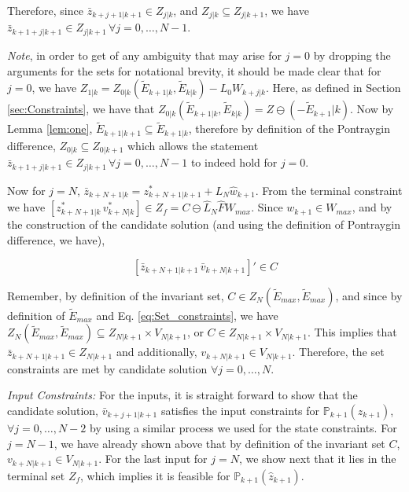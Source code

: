 Therefore, since $\bar{z}_{k+j+1|k+1} \in Z_{j|k}$, and $Z_{j|k} \subseteq Z_{j|k+1}$, we have $\bar{z}_{k+1+j|k+1} \in Z_{j|k+1}\,\forall j=0,\dotsc,N-1$. 

\textit{Note}, in order to get of any ambiguity that may arise for $j=0$ by dropping the arguments for the sets for notational brevity, it should be made clear that for $j=0$, we have $Z_{1|k} = Z_{0|k}(\tilde{E}_{k+1|k},\tilde{E}_{k|k})-L_0W_{k+j|k}$. Here, as defined in Section \ref{sec:Constraints}, we have that $Z_{0|k}(\tilde{E}_{k+1|k},\tilde{E}_{k|k}) = Z \ominus (-\tilde{E}_{k+1}|k)$. Now by Lemma \ref{lem:one}, $\tilde{E}_{k+1|k+1} \subseteq \tilde{E}_{k+1|k}$, therefore by definition of the Pontraygin difference, $Z_{0|k} \subseteq Z_{0|k+1}$ which allows the statement $\bar{z}_{k+1+j|k+1} \in Z_{j|k+1}\,\forall j=0,\dotsc,N-1$ to indeed hold for $j=0$.


Now for $j=N$, $\bar{z}_{k+N+1|k} = z^{*}_{k+N+1|k+1} + L_N\hat{w}_{k+1}$. From the terminal constraint we have $[z^{*}_{k+N+1|k}\, v^{*}_{k+N|k}] \in Z_f = C \ominus \hat{L}_N\hat{F}W_{max}$. Since $w_{k+1} \in W_{max}$, and by the construction of the candidate solution (and using the definition of Pontraygin difference, we have), 

\begin{equation}
\label{eq:CandidateInC}
[\bar{z}_{k+N+1|k+1}\, \bar{v}_{k+N|k+1}]' \in C
\end{equation}

Remember, by definition of the invariant set, $C \in Z_N(\tilde{E}_{max},\tilde{E}_{max})$, and since by definition of $\tilde{E}_{max}$ and Eq. \ref{eq:Set_constraints}, we have $Z_N(\tilde{E}_{max},\tilde{E}_{max}) \subseteq Z_{N|k+1} \times V_{N|k+1}$, or $C \in  Z_{N|k+1} \times {V}_{N|k+1}$. This implies that $\bar{z}_{k+N+1|k+1} \in Z_{N|k+1}$ and additionally, $v_{k+N|k+1} \in {V}_{N|k+1}$.
Therefore, the set constraints are met by candidate solution $\forall j=0,\dotsc,N$. 

\textit{Input Constraints:} For the inputs, it is straight forward to show that the candidate solution, $\bar{v}_{k+j+1|k+1}$ satisfies the input constraints for $\mathbb{P}_{k+1}(\hat{z}_{k+1}) $, $\forall j=0,\dotsc,N-2$ by using a similar process we used for the state constraints. For $j=N-1$, we have already shown above that by definition of the invariant set $C$, $v_{k+N|k+1} \in {V}_{N|k+1}$. For the last input for $j=N$, we show next that it lies in the terminal set $Z_f$, which implies it is feasible for $\mathbb{P}_{k+1}(\hat{z}_{k+1})$.

